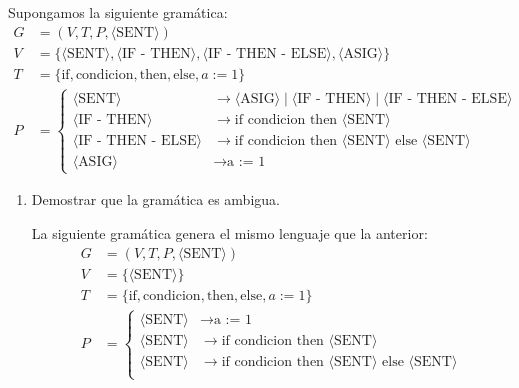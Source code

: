\begin{ejercicio}\label{ej:1.4.22}
    Supongamos la siguiente gramática:
    \begin{align*}
        G&=\left( V,T,P,\langle \text{SENT} \rangle \right)\\
        V&=\{ \langle \text{SENT} \rangle, \langle \text{IF - THEN} \rangle, \langle \text{IF - THEN - ELSE} \rangle, \langle \text{ASIG} \rangle \}\\
        T&=\{ \text{if}, \text{condicion}, \text{then}, \text{else}, a := 1 \} \\
        P&=\left\{
            \begin{aligned}
                \langle \text{SENT} \rangle &\rightarrow \langle \text{ASIG} \rangle \mid \langle \text{IF - THEN} \rangle \mid \langle \text{IF - THEN - ELSE} \rangle\\
                \langle \text{IF - THEN} \rangle &\rightarrow \text{if condicion then } \langle \text{SENT} \rangle\\
                \langle \text{IF - THEN - ELSE} \rangle &\rightarrow \text{if condicion then } \langle \text{SENT} \rangle \text{ else } \langle \text{SENT} \rangle\\
                \langle \text{ASIG} \rangle &\rightarrow \text{a := 1}
            \end{aligned}
        \right.
    \end{align*}
    \begin{enumerate}
        \item Demostrar que la gramática es ambigua.
        
        La siguiente gramática genera el mismo lenguaje que la anterior:
        \begin{align*}
            G&=\left( V,T,P,\langle \text{SENT} \rangle \right)\\
            V&=\{ \langle \text{SENT} \rangle\}\\
            T&=\{ \text{if}, \text{condicion}, \text{then}, \text{else}, a := 1 \} \\
            P&=\left\{
                \begin{aligned}
                    \langle \text{SENT} \rangle &\rightarrow \text{a := 1} \\
                    \langle \text{SENT} \rangle &\rightarrow \text{if condicion then } \langle \text{SENT} \rangle \\
                    \langle \text{SENT} \rangle &\rightarrow \text{if condicion then } \langle \text{SENT} \rangle \text{ else } \langle \text{SENT} \rangle\\
                \end{aligned}
            \right.
        \end{align*}


\end{enumerate}
\end{ejercicio}
